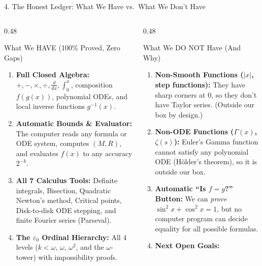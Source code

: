 \documentclass[aspectratio=169,11pt]{beamer}
\begin{document}
\begin{frame}[shrink=8]{4. The Honest Ledger: What We Have vs.\ What We Don't Have}
  \footnotesize
  \begin{columns}[T]
    \begin{column}{0.48\textwidth}
      \begin{block}{\textcolor{okgreen}{What We HAVE (100\% Proved, Zero Gaps)}}
        \begin{enumerate}
          \item \textbf{Full Closed Algebra:} $+, -, \times, \div, \frac{d}{dx}, \int_0^x$, composition $f(g(x))$, polynomial ODEs, and local inverse functions $g^{-1}(x)$.
          \item \textbf{Automatic Bounds \& Evaluator:} The computer reads any formula or ODE system, computes $(M, R)$, and evaluates $f(x)$ to any accuracy $2^{-k}$.
          \item \textbf{All 7 Calculus Tools:} Definite integrals, Bisection, Quadratic Newton's method, Critical points, Disk-to-disk ODE stepping, and finite Fourier series (Parseval).
          \item \textbf{The $\varepsilon_0$ Ordinal Hierarchy:} All 4 levels ($k < \omega$, $\omega$, $\omega^2$, and the $\omega$-tower) with impossibility proofs.
        \end{enumerate}
      \end{block}
    \end{column}
    \begin{column}{0.48\textwidth}
      \begin{block}{\textcolor{warnred}{What We DO NOT Have (And Why)}}
        \begin{enumerate}
          \item \textbf{Non-Smooth Functions ($|x|$, step functions):} They have sharp corners at $0$, so they don't have Taylor series. (Outside our box by design.)
          \item \textbf{Non-ODE Functions ($\Gamma(x)$, $\zeta(s)$):} Euler's Gamma function cannot satisfy any polynomial ODE (H\"older's theorem), so it is outside our box.
          \item \textbf{Automatic ``Is $f = g$?'' Button:} We can \emph{prove} $\sin^2 x + \cos^2 x = 1$, but no computer program can decide equality for all possible formulas.
          \item \textbf{Next Open Goals:}

\end{enumerate}
\end{block}
\end{column}
\end{columns}
\end{frame}
\end{document}
